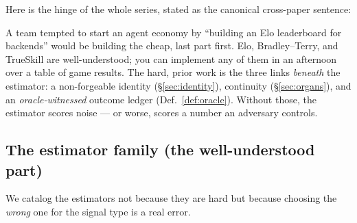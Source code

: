 \documentclass[11pt,a4paper]{article}
\theoremstyle{definition}
\begin{document}
Here is the hinge of the whole series, stated as the canonical cross-paper
sentence:


\noindent A team tempted to start an agent economy by ``building an Elo
leaderboard for backends'' would be building the cheap, last part first. Elo,
Bradley--Terry, and TrueSkill are well-understood; you can implement any of them in
an afternoon over a table of game results. The hard, prior work is
the three links \emph{beneath} the estimator: a non-forgeable identity
(\S\ref{sec:identity}), continuity (\S\ref{sec:organs}), and an
\emph{oracle-witnessed} outcome ledger (Def.~\ref{def:oracle}). Without those, the
estimator scores noise --- or worse, scores a number an adversary controls.

\subsection{The estimator family (the well-understood part)}

We catalog the estimators not because they are hard but because choosing the
\emph{wrong} one for the signal type is a real error.
\end{document}
